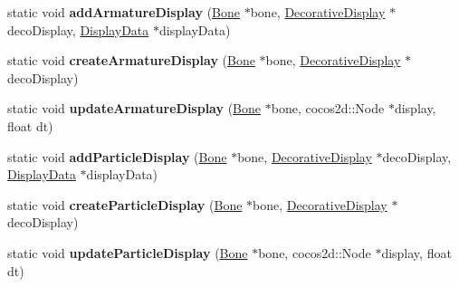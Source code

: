 \begin{DoxyCompactItemize}
\item 
\mbox{\label{classcocostudio_1_1DisplayFactory_a9ecff9d5d4eaf44a775451c2f462a7e3}} 
static void {\bfseries add\+Armature\+Display} (\hyperlink{classcocostudio_1_1Bone}{Bone} $\ast$bone, \hyperlink{classcocostudio_1_1DecorativeDisplay}{Decorative\+Display} $\ast$deco\+Display, \hyperlink{classcocostudio_1_1DisplayData}{Display\+Data} $\ast$display\+Data)
\item 
\mbox{\label{classcocostudio_1_1DisplayFactory_a23d7193ce57bec0e75143c26222b0157}} 
static void {\bfseries create\+Armature\+Display} (\hyperlink{classcocostudio_1_1Bone}{Bone} $\ast$bone, \hyperlink{classcocostudio_1_1DecorativeDisplay}{Decorative\+Display} $\ast$deco\+Display)
\item 
\mbox{\label{classcocostudio_1_1DisplayFactory_aa1e2fd36492c3338906ff64ecc99626b}} 
static void {\bfseries update\+Armature\+Display} (\hyperlink{classcocostudio_1_1Bone}{Bone} $\ast$bone, cocos2d\+::\+Node $\ast$display, float dt)
\item 
\mbox{\label{classcocostudio_1_1DisplayFactory_ab7877bf79bf2e6d317478662329ec8e9}} 
static void {\bfseries add\+Particle\+Display} (\hyperlink{classcocostudio_1_1Bone}{Bone} $\ast$bone, \hyperlink{classcocostudio_1_1DecorativeDisplay}{Decorative\+Display} $\ast$deco\+Display, \hyperlink{classcocostudio_1_1DisplayData}{Display\+Data} $\ast$display\+Data)
\item 
\mbox{\label{classcocostudio_1_1DisplayFactory_a9e65216ef2c68cbb6a3c2e8c595230ed}} 
static void {\bfseries create\+Particle\+Display} (\hyperlink{classcocostudio_1_1Bone}{Bone} $\ast$bone, \hyperlink{classcocostudio_1_1DecorativeDisplay}{Decorative\+Display} $\ast$deco\+Display)
\item 
\mbox{\label{classcocostudio_1_1DisplayFactory_a3b8da8c98332bb45e023f7d355abb4b0}} 
static void {\bfseries update\+Particle\+Display} (\hyperlink{classcocostudio_1_1Bone}{Bone} $\ast$bone, cocos2d\+::\+Node $\ast$display, float dt)
\end{DoxyCompactItemize}


